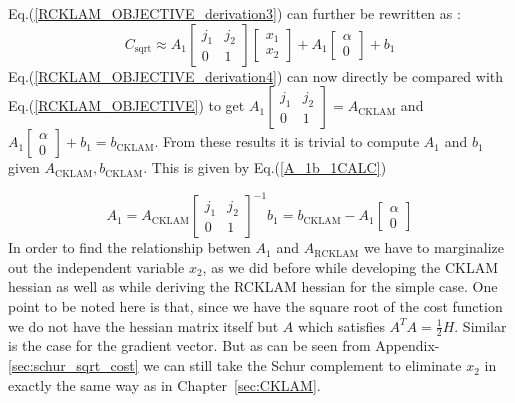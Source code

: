 Eq.(\ref{RCKLAM_OBJECTIVE_derivation3}) can further be rewritten as :
\begin{equation}
  C_\mathrm{sqrt}\approx A_1\begin{bmatrix}j_1 & j_2 \\ 0 & 1\end{bmatrix}\begin{bmatrix} x_1 \\ x_2 \end{bmatrix} + A_1\begin{bmatrix}\alpha \\ 0\end{bmatrix} + b_1
  \label{RCKLAM_OBJECTIVE_derivation4}
\end{equation}
Eq.(\ref{RCKLAM_OBJECTIVE_derivation4}) can now directly be compared with Eq.(\ref{RCKLAM_OBJECTIVE}) to get $A_1\begin{bmatrix}j_1 & j_2 \\ 0 & 1\end{bmatrix} = A_\mathrm{CKLAM}$ and $A_1\begin{bmatrix}\alpha \\ 0\end{bmatrix} + b_1 = b_\mathrm{CKLAM}$. From these results it is trivial to compute $A_1$ and $b_1$ given $A_\mathrm{CKLAM} , b_\mathrm{CKLAM}$. This is given by Eq.(\ref{A_1b_1CALC})

\begin{subequations}
  \begin{equation}
    A_1 = A_\mathrm{CKLAM}\begin{bmatrix}j_1 & j_2 \\ 0 & 1\end{bmatrix}^{-1}
  \end{equation}
  \begin{equation}
    b_1 = b_\mathrm{CKLAM} - A_1 \begin{bmatrix}\alpha \\ 0 \end{bmatrix}
  \end{equation}
  \label{A_1b_1CALC}
\end{subequations}
In order to find the relationship betwen $A_1$ and $A_\mathrm{RCKLAM}$ we have to marginalize out the independent variable $x_2$, as we did before while developing the CKLAM hessian as well as while deriving the RCKLAM hessian for the simple case. One point to be noted here is that, since we have the square root of the cost function we do not have the hessian matrix itself but $A$ which satisfies $A^TA = \frac{1}{2}H$. Similar is the case for the gradient vector. But as can be seen from Appendix-\ref{sec:schur_sqrt_cost} we can still take the Schur complement to eliminate $x_2$ in exactly the same way as in Chapter~\ref{sec:CKLAM}.


